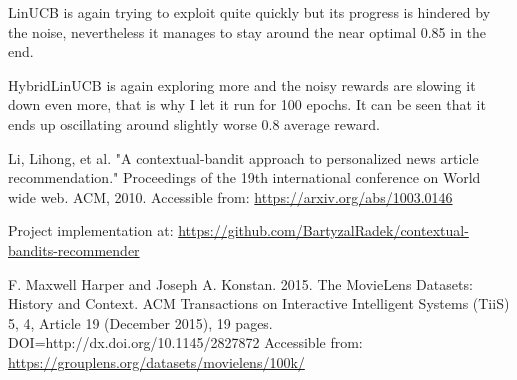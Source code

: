\documentclass[12pt, titlepage]{article}
\begin{document}
LinUCB is again trying to exploit quite quickly but its progress is hindered by the noise, nevertheless it manages to stay around the near optimal 0.85 in the end.

HybridLinUCB is again exploring more and the noisy rewards are slowing it down even more, that is why I let it run for 100 epochs. It can be seen that it ends up oscillating around slightly worse 0.8 average reward.



\begin{thebibliography}{0}

   Li, Lihong, et al. "A contextual-bandit approach to personalized news article recommendation." Proceedings of the 19th international conference on World wide web. ACM, 2010. Accessible from: \url{https://arxiv.org/abs/1003.0146}
  
   Project implementation at: \url{https://github.com/BartyzalRadek/contextual-bandits-recommender}
  
   F. Maxwell Harper and Joseph A. Konstan. 2015. The MovieLens Datasets:
History and Context. ACM Transactions on Interactive Intelligent
Systems (TiiS) 5, 4, Article 19 (December 2015), 19 pages.
DOI=http://dx.doi.org/10.1145/2827872 Accessible from: \url{https://grouplens.org/datasets/movielens/100k/}



\end{thebibliography}
\end{document}
